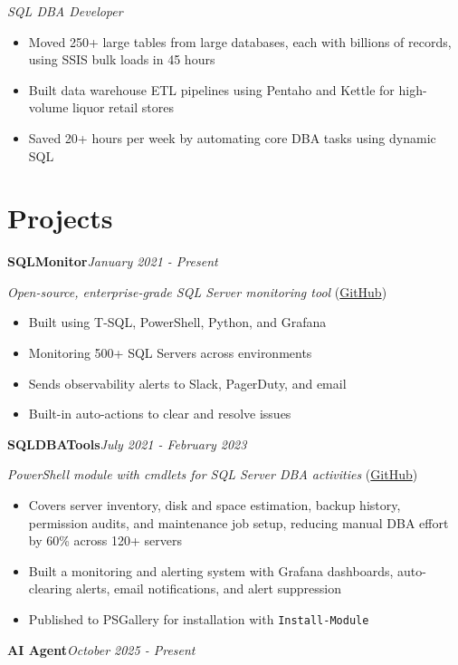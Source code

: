 \documentclass[10pt,a4paper]{article}
\begin{document}
\textit{SQL DBA Developer}\\[-5pt]
\begin{itemize}
  \item Moved 250+ large tables from large databases, each with billions of records, using SSIS bulk loads in 45 hours
  \item Built data warehouse ETL pipelines using Pentaho and Kettle for high-volume liquor retail stores
  \item Saved 20+ hours per week by automating core DBA tasks using dynamic SQL
\end{itemize}

\section{Projects}

\noindent\textbf{SQLMonitor}\hfill \textit{January 2021 - Present}

\textit{Open-source, enterprise-grade SQL Server monitoring tool} (\href{https://github.com/imajaydwivedi/SQLMonitor}{GitHub})
\begin{itemize}
  \item Built using T-SQL, PowerShell, Python, and Grafana
  \item Monitoring 500+ SQL Servers across environments
  \item Sends observability alerts to Slack, PagerDuty, and email
  \item Built-in auto-actions to clear and resolve issues
\end{itemize}
\vspace{14.7pt}
\noindent\textbf{SQLDBATools}\hfill \textit{July 2021 - February 2023}

\textit{PowerShell module with cmdlets for SQL Server DBA activities} (\href{https://github.com/imajaydwivedi/SQLDBATools}{GitHub})
\begin{itemize}
  \item Covers server inventory, disk and space estimation, backup history, permission audits, and maintenance job setup, reducing manual DBA effort by 60\% across 120+ servers
  \item Built a monitoring and alerting system with Grafana dashboards, auto-clearing alerts, email notifications, and alert suppression
  \item Published to PSGallery for installation with \texttt{Install-Module}
\end{itemize}
\vspace{14.7pt}
\noindent\textbf{AI Agent}\hfill \textit{October 2025 - Present}
\end{document}
